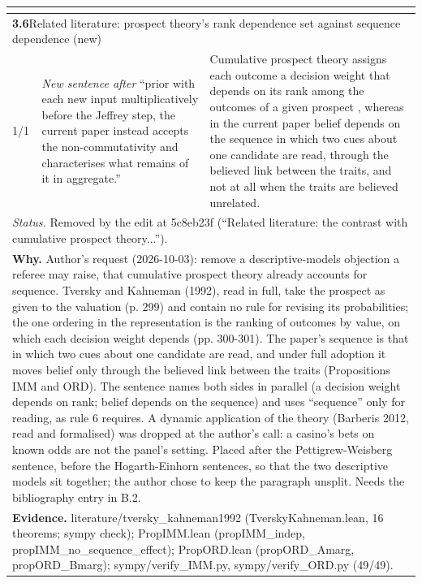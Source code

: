 \documentclass[10pt]{article}
\theoremstyle{definition}
\newlength{\fullw}\setlength{\fullw}{25.9cm}
\newcommand{\entryhead}[2]{\multicolumn{3}{|l|}{\rule{0pt}{2.6ex}\large\textbf{#1}\quad #2} \\ \hline}
\begin{document}
{\begin{longtable}{|p{0.9cm}|p{12.2cm}|p{12.2cm}|}
\multicolumn{3}{|l|}{} \\ \hline
\entryhead{3.6}{Related literature: prospect theory's rank dependence set against sequence dependence (new)\quad{\footnotesize\textit{(formerly C.20)}}}
1/1 & \textit{New sentence after} ``prior with each new input multiplicatively before the Jeffrey step, the current paper instead accepts the non-commutativity and characterises what remains of it in aggregate.'' & Cumulative prospect theory assigns each outcome a decision weight that depends on its rank among the outcomes of a given prospect \citep{TverskyKahneman1992}, whereas in the current paper belief depends on the sequence in which two cues about one candidate are read, through the believed link between the traits, and not at all when the traits are believed unrelated. \\ \hline
\multicolumn{3}{|p{\fullw}|}{\textit{Status.} Removed by the edit at 5c8eb23f (``Related literature: the contrast with cumulative prospect theory...'').} \\ \hline
\multicolumn{3}{|p{\fullw}|}{\textbf{Why.} Author's request (2026-10-03): remove a descriptive-models objection a referee may raise, that cumulative prospect theory already accounts for sequence. Tversky and Kahneman (1992), read in full, take the prospect as given to the valuation (p. 299) and contain no rule for revising its probabilities; the one ordering in the representation is the ranking of outcomes by value, on which each decision weight depends (pp. 300-301). The paper's sequence is that in which two cues about one candidate are read, and under full adoption it moves belief only through the believed link between the traits (Propositions IMM and ORD). The sentence names both sides in parallel (a decision weight depends on rank; belief depends on the sequence) and uses ``sequence'' only for reading, as rule 6 requires. A dynamic application of the theory (Barberis 2012, read and formalised) was dropped at the author's call: a casino's bets on known odds are not the panel's setting. Placed after the Pettigrew-Weisberg sentence, before the Hogarth-Einhorn sentences, so that the two descriptive models sit together; the author chose to keep the paragraph unsplit. Needs the bibliography entry in B.2.} \\
\multicolumn{3}{|p{\fullw}|}{\textbf{Evidence.} literature/tversky\_kahneman1992 (TverskyKahneman.lean, 16 theorems; sympy check); PropIMM.lean (propIMM\_indep, propIMM\_no\_sequence\_effect); PropORD.lean (propORD\_Amarg, propORD\_Bmarg); sympy/verify\_IMM.py, sympy/verify\_ORD.py (49/49).} \\ \hline

\end{longtable}}
\end{document}
